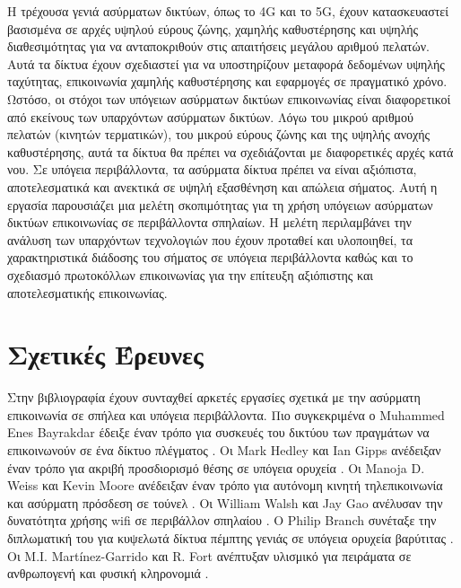 \documentclass[12pt]{paper}
\begin{document}
\begin{multicols*}{2}
        Η τρέχουσα γενιά ασύρματων δικτύων, όπως το 4G και το 5G, έχουν κατασκευαστεί
        βασισμένα σε αρχές υψηλού εύρους ζώνης, χαμηλής καθυστέρησης και υψηλής
        διαθεσιμότητας για να ανταποκριθούν στις απαιτήσεις μεγάλου αριθμού πελατών. Αυτά
        τα δίκτυα έχουν σχεδιαστεί για να υποστηρίζουν μεταφορά δεδομένων υψηλής
        ταχύτητας, επικοινωνία χαμηλής καθυστέρησης και εφαρμογές σε πραγματικό χρόνο.
        Ωστόσο, οι στόχοι των υπόγειων ασύρματων δικτύων επικοινωνίας είναι διαφορετικοί
        από εκείνους των υπαρχόντων ασύρματων δικτύων. Λόγω του μικρού αριθμού πελατών
        (κινητών τερματικών), του μικρού εύρους ζώνης και της υψηλής ανοχής καθυστέρησης,
        αυτά τα δίκτυα θα πρέπει να σχεδιάζονται με διαφορετικές αρχές κατά νου. Σε
        υπόγεια περιβάλλοντα, τα ασύρματα δίκτυα πρέπει να είναι αξιόπιστα, αποτελεσματικά
        και ανεκτικά σε υψηλή εξασθένηση και απώλεια σήματος.
        Αυτή η εργασία παρουσιάζει μια μελέτη σκοπιμότητας για τη χρήση υπόγειων ασύρματων
        δικτύων επικοινωνίας σε περιβάλλοντα σπηλαίων. Η μελέτη περιλαμβάνει την ανάλυση
        των υπαρχόντων τεχνολογιών που έχουν προταθεί και υλοποιηθεί, τα χαρακτηριστικά
        διάδοσης του σήματος σε υπόγεια περιβάλλοντα καθώς και το σχεδιασμό πρωτοκόλλων
        επικοινωνίας για την επίτευξη αξιόπιστης και αποτελεσματικής επικοινωνίας.

    \section{\normalsize \textsf{Σχετικές Έρευνες}} Στην βιβλιογραφία έχουν συνταχθεί
        αρκετές εργασίες σχετικά με την ασύρματη επικοινωνία σε σπήλεα και υπόγεια
        περιβάλλοντα. Πιο συγκεκριμένα ο Muhammed Enes Bayrakdar έδειξε έναν τρόπο για
        συσκευές του δικτύου των πραγμάτων να επικοινωνούν σε ένα δίκτυο πλέγματος
        \cite{bayrakdar_rule_2019}. Οι Mark Hedley και Ian Gipps ανέδειξαν έναν τρόπο για
        ακριβή προσδιορισμό θέσης σε υπόγεια ορυχεία \cite{hedley_accurate_2013}. Οι
        Manoja D. Weiss και Kevin Moore ανέδειξαν έναν τρόπο για αυτόνομη κινητή
        τηλεπικοινωνία και ασύρματη πρόσδεση σε τούνελ \cite{weiss_autonomous_2009}. Οι
        William Walsh και Jay Gao ανέλυσαν την δυνατότητα χρήσης wifi σε περιβάλλον
        σπηλαίου \cite{walsh_communications_2018}. Ο Philip Branch συνέταξε την
        διπλωματική του για κυψελωτά δίκτυα πέμπτης γενιάς σε υπόγεια ορυχεία βαρύτιτας
        \cite{branch_fifth_2021}. Οι M.I. Martínez-Garrido και R. Fort ανέπτυξαν υλισμικό
        για πειράματα σε ανθρωπογενή και φυσική κληρονομιά
        \cite{martinez-garrido_experimental_2016}.


\end{multicols*}
\end{document}
